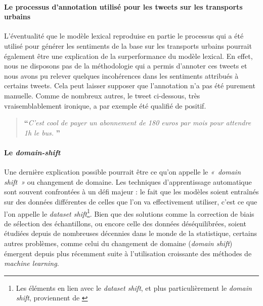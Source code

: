 \documentclass[11pt,french,french]{article}
\let\rmarkdownfootnote\footnote%
\def\footnote{\protect\rmarkdownfootnote}
\begin{document}
\paragraph{Le processus d'annotation utilisé pour les tweets sur les
transports
urbains}\label{le-processus-dannotation-utilisuxe9-pour-les-tweets-sur-les-transports-urbains}

L'éventualité que le modèle lexical reproduise en partie le processus
qui a été utilisé pour générer les sentiments de la base sur les
transports urbains pourrait également être une explication de la
surperformance du modèle lexical. En effet, nous ne disposons pas de la
méthodologie qui a permis d'annoter ces tweets et nous avons pu relever
quelques incohérences dans les sentiments attribués à certains tweets.
Cela peut laisser supposer que l'annotation n'a pas été purement
manuelle. Comme de nombreux autres, le tweet ci-dessous, très
vraisemblablement ironique, a par exemple été qualifié de positif.

\begin{quote}
\LARGE \textbf{``}\normalsize \emph{C'est cool de payer un abonnement de 180 euros par mois pour attendre 1h le bus.} \LARGE \textbf{''}\normalsize
\end{quote}

\paragraph{\texorpdfstring{Le
\emph{domain-shift}}{Le domain-shift}}\label{le-domain-shift}

Une dernière explication possible pourrait être ce qu'on appelle le
\emph{« domain shift »} ou changement de domaine. Les techniques
d'apprentissage automatique sont souvent confrontées à un défi majeur :
le fait que les modèles soient entraînés sur des données différentes de
celles que l'on va effectivement utiliser, c'est ce que l'on appelle le
\emph{dataset shift}\footnote{Les éléments en lien avec le \emph{dataset shift}, et plus particulièrement le \emph{domain shift}, proviennent de \cite{Candela}}.
Bien que des solutions comme la correction de biais de sélection des
échantillons, ou encore celle des données déséquilibrées, soient
étudiées depuis de nombreuses décennies dans le monde de la statistique,
certains autres problèmes, comme celui du changement de domaine
(\emph{domain shift}) émergent depuis plus récemment suite à
l'utilisation croissante des méthodes de \emph{machine learning}.
\end{document}
